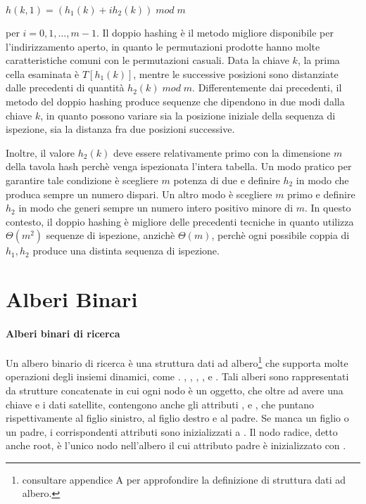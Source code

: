 \(h(k,1) = (h_1(k)+ih_2(k))\;mod\;m\)

\noindent per \(i=0,1,...,m-1\). Il doppio hashing è il metodo migliore disponibile per l'indirizzamento aperto, in quanto le permutazioni prodotte hanno molte caratteristiche comuni con le permutazioni casuali. Data la chiave \(k\), la prima cella esaminata è \(T[h_1(k)]\), mentre le successive posizioni sono distanziate dalle precedenti di quantità \(h_2(k)\;mod\;m\). Differentemente dai precedenti, il metodo del doppio hashing produce sequenze che dipendono in due modi dalla chiave \(k\), in quanto possono variare sia la posizione iniziale della sequenza di ispezione, sia la distanza fra due posizioni successive. 

Inoltre, il valore \(h_2(k)\) deve essere relativamente primo con la dimensione \(m\) della tavola hash perchè venga ispezionata l'intera tabella. Un modo pratico per garantire tale condizione è scegliere \(m\) potenza di due e definire \(h_2\) in modo che produca sempre un numero dispari. Un altro modo è scegliere \(m\) primo e definire \(h_2\) in modo che generi sempre un numero intero positivo minore di \(m\). In questo contesto, il doppio hashing è migliore delle precedenti tecniche in quanto utilizza \(\Theta(m^2)\) sequenze di ispezione, anzichè \(\Theta(m)\), perchè ogni possibile coppia di \(h_1, h_2\) produce una distinta sequenza di ispezione.

\section{Alberi Binari}

\paragraph{Alberi binari di ricerca}
Un albero binario di ricerca è una struttura dati ad albero\footnote{consultare appendice A per approfondire la definizione di struttura dati ad albero.} che supporta molte operazioni degli insiemi dinamici, come . , , , ,  e . Tali alberi sono rappresentati da strutture concatenate in cui ogni nodo è un oggetto, che oltre ad avere una chiave e i dati satellite, contengono anche gli attributi ,  e , che puntano rispettivamente al figlio sinistro, al figlio destro e al padre. Se manca un figlio o un padre, i corrispondenti attributi sono inizializzati a . Il nodo radice, detto anche root, è l'unico nodo nell'albero il cui attributo padre è inizializzato con .

